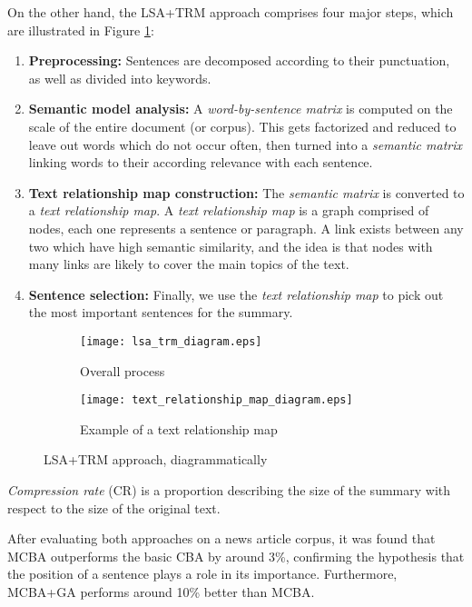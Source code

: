 \mbox{}

On the other hand, the LSA+TRM approach comprises four major steps, which are illustrated in Figure \ref{fig:lsa_trm_diagrams}:

\begin{enumerate}
\item \textbf{Preprocessing:} Sentences are decomposed according to their punctuation, as well as divided into keywords.
\item \textbf{Semantic model analysis:} A \textit{word-by-sentence matrix} is computed on the scale of the entire document (or corpus). This  gets factorized and reduced to leave out words which do not occur often, then turned into a \textit{semantic matrix} linking words to their according relevance with each sentence.
\item \textbf{Text relationship map construction:} The \textit{semantic matrix} is converted to a \textit{text relationship map}. A \textit{text relationship map} is a graph comprised of nodes, each one represents a sentence or paragraph. A link exists between any two which have high semantic similarity, and the idea is that nodes with many links are likely to cover the main topics of the text.
\item \textbf{Sentence selection:} Finally, we use the \textit{text relationship map} to pick out the most important sentences for the summary.
\end{enumerate}

\begin{figure}[H]
\begin{subfigure}{0.5\textwidth}
\texttt{[image: lsa\_trm\_diagram.eps]}
\caption{\cite{yeh_text_2005} Overall process}
\end{subfigure}
\begin{subfigure}{0.5\textwidth}
\texttt{[image: text\_relationship\_map\_diagram.eps]}
\caption{\cite{yeh_text_2005} Example of a text relationship map}
\end{subfigure}
\caption{LSA+TRM approach, diagrammatically}
\label{fig:lsa_trm_diagrams}
\end{figure}

\noindent
\textit{Compression rate} (CR) is a proportion describing the size of the summary with respect to the size of the original text.

After evaluating both approaches on a news article corpus, it was found that MCBA outperforms the basic CBA by around 3\%, confirming the hypothesis that the position of a sentence plays a role in its importance. Furthermore, MCBA+GA performs around 10\% better than MCBA.


